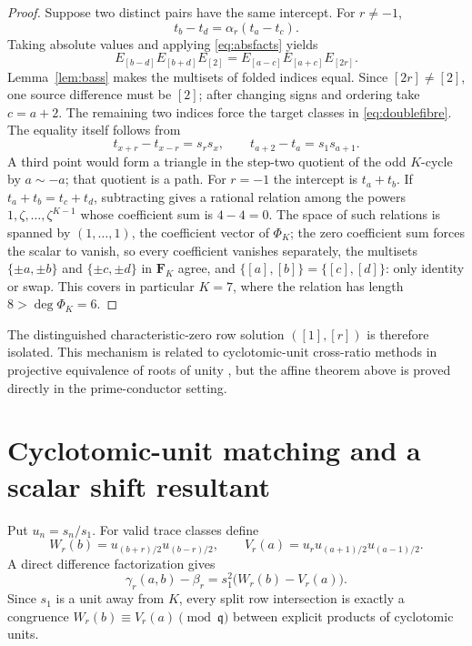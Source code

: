 \begin{proof}
Suppose two distinct pairs have the same intercept.  For $r\ne-1$,
\[
t_b-t_d=\alpha_r(t_a-t_c).
\]
Taking absolute values and applying \eqref{eq:absfacts} yields
\[
E_{[b-d]}E_{[b+d]}E_{[2]}
 =E_{[a-c]}E_{[a+c]}E_{[2r]}.
\]
Lemma~\ref{lem:bass} makes the multisets of folded indices equal.  Since
$[2r]\ne[2]$, one source difference must be $[2]$; after changing signs and
ordering take $c=a+2$.  The remaining two indices force the target classes in
\eqref{eq:doublefibre}.  The equality itself follows from
\[
t_{x+r}-t_{x-r}=s_rs_x,
\qquad
t_{a+2}-t_a=s_1s_{a+1}.
\]
A third point would form a triangle in the step-two quotient of the odd
$K$-cycle by $a\sim-a$; that quotient is a path.  For $r=-1$ the intercept is
$t_a+t_b$.  If $t_a+t_b=t_c+t_d$, subtracting gives a rational relation
among the powers $1,\zeta,\ldots,\zeta^{K-1}$ whose coefficient sum is
$4-4=0$.  The space of such relations is spanned by $(1,\ldots,1)$, the
coefficient vector of $\Phi_K$; the zero coefficient sum forces the scalar
to vanish, so every coefficient vanishes separately, the multisets
$\{\pm a,\pm b\}$ and $\{\pm c,\pm d\}$ in $\mathbf F_K$ agree, and
$\{[a],[b]\}=\{[c],[d]\}$: only identity or swap.  This covers in
particular $K=7$, where the relation has length $8>\deg\Phi_K=6$.
\end{proof}

The distinguished characteristic-zero row solution $([1],[r])$ is therefore
isolated.  This mechanism is related to cyclotomic-unit cross-ratio methods in
projective equivalence of roots of unity \cite{Fu2022}, but the affine theorem
above is proved directly in the prime-conductor setting.
\section{Cyclotomic-unit matching and a scalar shift resultant}

Put $u_n=s_n/s_1$.  For valid trace classes define
\begin{equation}\label{eq:WV}
W_r(b)=u_{(b+r)/2}u_{(b-r)/2},\qquad
V_r(a)=u_ru_{(a+1)/2}u_{(a-1)/2}.
\end{equation}
A direct difference factorization gives
\begin{equation}\label{eq:unitmatch}
\gamma_r(a,b)-\beta_r=s_1^2\bigl(W_r(b)-V_r(a)\bigr).
\end{equation}
Since $s_1$ is a unit away from $K$, every split row intersection is exactly a
congruence $W_r(b)\equiv V_r(a)\pmod{\mathfrak q}$ between explicit products
of cyclotomic units.

